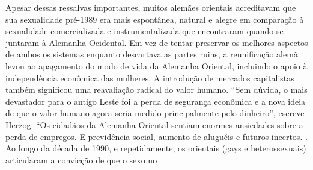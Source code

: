  \par 
Apesar dessas ressalvas importantes, muitos alemães orientais acreditavam que sua sexualidade pré-1989 era mais espontânea, natural e alegre em comparação à sexualidade comercializada e instrumentalizada que encontraram quando se juntaram à Alemanha Ocidental. Em vez de tentar preservar os melhores aspectos de ambos os sistemas enquanto descartava as partes ruins, a reunificação alemã levou ao apagamento do modo de vida da Alemanha Oriental, incluindo o apoio à independência econômica das mulheres. A introdução de mercados capitalistas também significou uma reavaliação radical do valor humano. “Sem dúvida, o mais devastador para o antigo Leste foi a perda de segurança econômica e a nova ideia de que o valor humano agora seria medido principalmente pelo dinheiro”, escreve Herzog. “Os cidadãos da Alemanha Oriental sentiam enormes ansiedades sobre a perda de empregos. E previdência social, aumento de aluguéis e futuros incertos. . Ao longo da década de 1990, e repetidamente, os orientais (gays e heterossexuais) articularam a convicção de que o sexo no
 \par 

